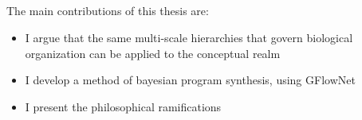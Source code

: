 \subsection{}
The main contributions of this thesis are: 
\begin{itemize}
    \item I argue that the same multi-scale hierarchies that govern biological organization can be applied to the conceptual realm
    \item I develop a method of bayesian program synthesis, using GFlowNet
    \item I present the philosophical ramifications
\end{itemize}





